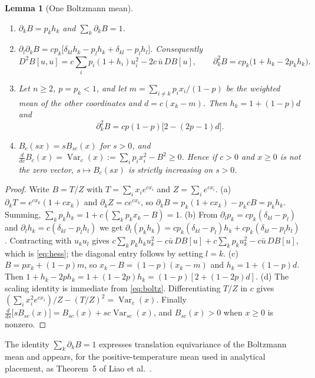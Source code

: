 \documentclass[11pt]{article}
\theoremstyle{plain}
\newtheorem{lemma}[theorem]{Lemma}
\theoremstyle{definition}
\theoremstyle{remark}
\DeclareMathOperator{\Var}{Var}
\begin{document}
\begin{lemma}[One Boltzmann mean]\label{lem:derivatives}
\begin{enumerate}[nosep,label=(\alph*)]
\item $\partial_kB=p_kh_k$ and $\sum_k\partial_kB=1$.
\item $\partial_l\partial_kB=cp_k\bigl[\delta_{kl}h_k-p_lh_k+\delta_{kl}-p_lh_l\bigr]$. Consequently
\begin{equation}\label{eq:hess}
 D^2B[u,u]=c\sum_ip_i(1+h_i)u_i^2-2c\,\bar u\,DB[u],\qquad
 \partial_k^2B=cp_k\bigl(1+h_k-2p_kh_k\bigr).
\end{equation}
\item Let $n\ge2$, $p=p_k<1$, and let $m=\sum_{i\ne k}p_ix_i/(1-p)$ be the weighted mean of the other coordinates and $d=c(x_k-m)$. Then $h_k=1+(1-p)d$ and
\begin{equation}\label{eq:ownweight}
 \partial_k^2B=cp(1-p)\bigl[2-(2p-1)d\bigr].
\end{equation}
\item $B_c(sx)=sB_{sc}(x)$ for $s>0$, and $\frac{d}{dc}B_c(x)=\Var_c(x):=\sum_ip_ix_i^2-B^2\ge0$. Hence if $c>0$ and $x\ge0$ is not the zero vector, $s\mapsto B_c(sx)$ is strictly increasing on $s>0$.
\end{enumerate}
\end{lemma}

\begin{proof}
Write $B=T/Z$ with $T=\sum_ix_ie^{cx_i}$ and $Z=\sum_ie^{cx_i}$. (a) $\partial_kT=e^{cx_k}(1+cx_k)$ and $\partial_kZ=ce^{cx_k}$, so $\partial_kB=p_k(1+cx_k)-p_kcB=p_kh_k$. Summing, $\sum_kp_kh_k=1+c(\sum_kp_kx_k-B)=1$.
(b) From $\partial_lp_k=cp_k(\delta_{kl}-p_l)$ and $\partial_lh_k=c(\delta_{kl}-p_lh_l)$ we get $\partial_l(p_kh_k)=cp_k(\delta_{kl}-p_l)h_k+cp_k(\delta_{kl}-p_lh_l)$. Contracting with $u_ku_l$ gives $c\sum_kp_kh_ku_k^2-c\bar u\,DB[u]+c\sum_kp_ku_k^2-c\bar u\,DB[u]$, which is \eqref{eq:hess}; the diagonal entry follows by setting $l=k$.
(c) $B=px_k+(1-p)m$, so $x_k-B=(1-p)(x_k-m)$ and $h_k=1+(1-p)d$. Then $1+h_k-2ph_k=1+(1-2p)h_k=(1-p)[2+(1-2p)d]$.
(d) The scaling identity is immediate from \eqref{eq:boltz}. Differentiating $T/Z$ in $c$ gives $(\sum_ix_i^2e^{cx_i})/Z-(T/Z)^2=\Var_c(x)$. Finally $\frac{d}{ds}\bigl[sB_{sc}(x)\bigr]=B_{sc}(x)+sc\Var_{sc}(x)$, and $B_{sc}(x)>0$ when $x\ge0$ is nonzero.
\end{proof}

The identity $\sum_k\partial_kB=1$ expresses translation equivariance of the Boltzmann mean and appears, for the positive-temperature mean used in analytical placement, as Theorem~5 of Liao et al.\ \cite{Liao2023}.
\end{document}
